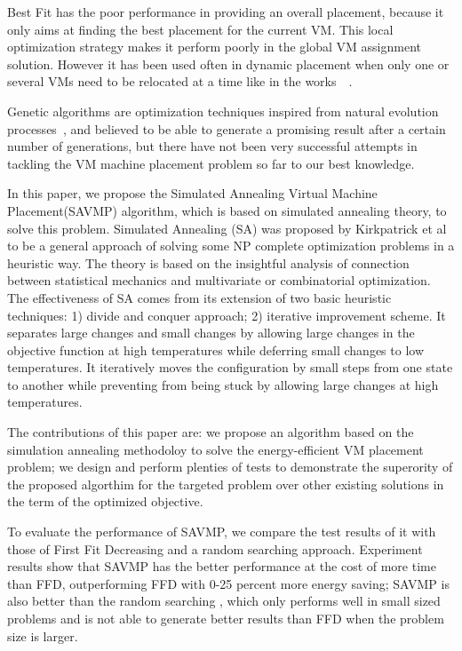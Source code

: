 \documentclass[10pt, conference, compsocconf]{IEEEtran}
\begin{document}
Best Fit has the poor performance in providing an overall placement, because it
only aims at finding the best placement for the current VM. This local
optimization strategy makes it perform poorly in the global VM assignment
solution.
However it has been used often in dynamic placement when only one or several VMs
need to be relocated at a time like in the
works~\cite{calheiros11}~\cite{beloglazov10}.

Genetic algorithms are optimization techniques inspired from natural
evolution processes~\cite{hertz00}, and  believed to be able to generate a
promising result after a certain number of generations, but there have not been very successful
attempts in tackling the VM machine placement problem so far to our best
knowledge.

In this paper, we propose the Simulated Annealing Virtual Machine Placement(SAVMP)
algorithm, which is based on simulated annealing theory, to solve this problem.
Simulated Annealing (SA) was proposed by Kirkpatrick et al~\cite{kirkpatrick83}
to be a general approach of solving some NP complete optimization
problems in a heuristic way.
The theory is based on the insightful analysis of connection between statistical
mechanics and multivariate or combinatorial optimization. The effectiveness of
SA comes from its extension of two basic heuristic techniques: 1) divide and
conquer approach; 2) iterative improvement scheme. It separates large changes
and small changes by allowing large changes in the objective function at high
temperatures while deferring small changes to low temperatures. It iteratively
moves the configuration by small steps from one state to another while
preventing from being stuck by allowing large changes at high temperatures.

The contributions of this paper are: we propose an algorithm based on the
simulation annealing methodoloy to solve the energy-efficient VM placement
problem; we design and perform plenties of tests to demonstrate the
superority of the proposed algorthim for the targeted problem over other
existing solutions in the term of the optimized objective.

To evaluate the performance of SAVMP, we compare the test results of it with
those of First Fit Decreasing and a random searching approach. Experiment results show that SAVMP has the better
performance at the cost of more time than FFD, outperforming FFD with 0-25
percent more energy saving; SAVMP is also better than the random searching
, which only performs well in small sized problems and is not
able to generate better results than FFD when the problem size is larger.
\end{document}
